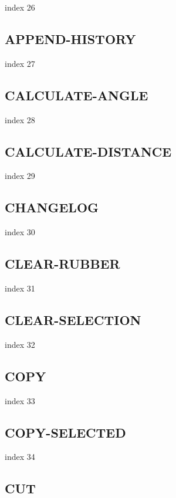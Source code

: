 \documentclass[a4paper]{report}
\begin{document}
index 26

\subsection{APPEND-HISTORY}

index 27

\subsection{CALCULATE-ANGLE}

index 28

\subsection{CALCULATE-DISTANCE}

index 29

\subsection{CHANGELOG}

index 30

\subsection{CLEAR-RUBBER}

index 31

\subsection{CLEAR-SELECTION}

index 32

\subsection{COPY}

index 33

\subsection{COPY-SELECTED}

index 34

\subsection{CUT}
\end{document}
